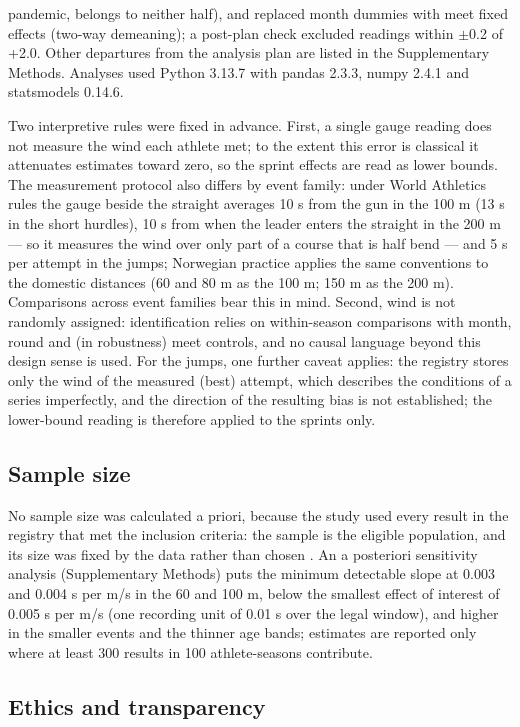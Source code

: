 \documentclass[12pt,a4paper]{article}
\begin{document}
pandemic, belongs to neither half), and replaced month dummies with meet fixed effects (two-way demeaning); a post-plan check excluded readings within $\pm$0.2 of +2.0. Other departures from the analysis plan are listed in the Supplementary Methods. Analyses used Python 3.13.7 with pandas 2.3.3, numpy 2.4.1 and statsmodels 0.14.6.

Two interpretive rules were fixed in advance. First, a single gauge reading does not measure the wind each athlete met; to the extent this error is classical it attenuates estimates toward zero, so the sprint effects are read as lower bounds. The measurement protocol also differs by event family: under World Athletics rules the gauge beside the straight averages 10 s from the gun in the 100 m (13 s in the short hurdles), 10 s from when the leader enters the straight in the 200 m --- so it measures the wind over only part of a course that is half bend --- and 5 s per attempt in the jumps; Norwegian practice applies the same conventions to the domestic distances (60 and 80 m as the 100 m; 150 m as the 200 m). Comparisons across event families bear this in mind. Second, wind is not randomly assigned: identification relies on within-season comparisons with month, round and (in robustness) meet controls, and no causal language beyond this design sense is used. For the jumps, one further caveat applies: the registry stores only the wind of the measured (best) attempt, which describes the conditions of a series imperfectly, and the direction of the resulting bias is not established; the lower-bound reading is therefore applied to the sprints only.

\subsection{Sample size}

No sample size was calculated a priori, because the study used every result in the registry that met the inclusion criteria: the sample is the eligible population, and its size was fixed by the data rather than chosen \citep{lakens2022}. An a posteriori sensitivity analysis (Supplementary Methods) puts the minimum detectable slope at 0.003 and 0.004 s per m/s in the 60 and 100 m, below the smallest effect of interest of 0.005 s per m/s (one recording unit of 0.01 s over the legal window), and higher in the smaller events and the thinner age bands; estimates are reported only where at least 300 results in 100 athlete-seasons contribute.

\subsection{Ethics and transparency}
\end{document}
